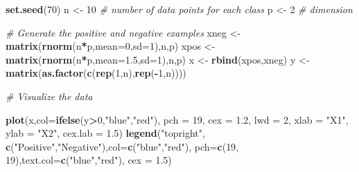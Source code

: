 \documentclass[
]{book}
\newenvironment{Shaded}{\begin{snugshade}}{\end{snugshade}}
\newcommand{\AttributeTok}[1]{\textcolor[rgb]{0.13,0.29,0.53}{#1}}
\newcommand{\CommentTok}[1]{\textcolor[rgb]{0.56,0.35,0.01}{\textit{#1}}}
\newcommand{\DecValTok}[1]{\textcolor[rgb]{0.00,0.00,0.81}{#1}}
\newcommand{\FloatTok}[1]{\textcolor[rgb]{0.00,0.00,0.81}{#1}}
\newcommand{\FunctionTok}[1]{\textcolor[rgb]{0.13,0.29,0.53}{\textbf{#1}}}
\newcommand{\NormalTok}[1]{#1}
\newcommand{\OtherTok}[1]{\textcolor[rgb]{0.56,0.35,0.01}{#1}}
\newcommand{\SpecialCharTok}[1]{\textcolor[rgb]{0.81,0.36,0.00}{\textbf{#1}}}
\newcommand{\StringTok}[1]{\textcolor[rgb]{0.31,0.60,0.02}{#1}}
\theoremstyle{definition}
\theoremstyle{definition}
\theoremstyle{definition}
\theoremstyle{definition}
\theoremstyle{remark}
\begin{document}
\begin{Shaded}
\begin{Highlighting}[]

    \FunctionTok{set.seed}\NormalTok{(}\DecValTok{70}\NormalTok{)}
\NormalTok{    n }\OtherTok{\textless{}{-}} \DecValTok{10} \CommentTok{\# number of data points for each class}
\NormalTok{    p }\OtherTok{\textless{}{-}} \DecValTok{2} \CommentTok{\# dimension}

    \CommentTok{\# Generate the positive and negative examples}
\NormalTok{    xneg }\OtherTok{\textless{}{-}} \FunctionTok{matrix}\NormalTok{(}\FunctionTok{rnorm}\NormalTok{(n}\SpecialCharTok{*}\NormalTok{p,}\AttributeTok{mean=}\DecValTok{0}\NormalTok{,}\AttributeTok{sd=}\DecValTok{1}\NormalTok{),n,p)}
\NormalTok{    xpos }\OtherTok{\textless{}{-}} \FunctionTok{matrix}\NormalTok{(}\FunctionTok{rnorm}\NormalTok{(n}\SpecialCharTok{*}\NormalTok{p,}\AttributeTok{mean=}\FloatTok{1.5}\NormalTok{,}\AttributeTok{sd=}\DecValTok{1}\NormalTok{),n,p)}
\NormalTok{    x }\OtherTok{\textless{}{-}} \FunctionTok{rbind}\NormalTok{(xpos,xneg)}
\NormalTok{    y }\OtherTok{\textless{}{-}} \FunctionTok{matrix}\NormalTok{(}\FunctionTok{as.factor}\NormalTok{(}\FunctionTok{c}\NormalTok{(}\FunctionTok{rep}\NormalTok{(}\DecValTok{1}\NormalTok{,n),}\FunctionTok{rep}\NormalTok{(}\SpecialCharTok{{-}}\DecValTok{1}\NormalTok{,n))))}

    \CommentTok{\# Visualize the data}
    
    \FunctionTok{plot}\NormalTok{(x,}\AttributeTok{col=}\FunctionTok{ifelse}\NormalTok{(y}\SpecialCharTok{\textgreater{}}\DecValTok{0}\NormalTok{,}\StringTok{"blue"}\NormalTok{,}\StringTok{"red"}\NormalTok{), }\AttributeTok{pch =} \DecValTok{19}\NormalTok{, }\AttributeTok{cex =} \FloatTok{1.2}\NormalTok{, }\AttributeTok{lwd =} \DecValTok{2}\NormalTok{, }
         \AttributeTok{xlab =} \StringTok{"X1"}\NormalTok{, }\AttributeTok{ylab =} \StringTok{"X2"}\NormalTok{, }\AttributeTok{cex.lab =} \FloatTok{1.5}\NormalTok{)}
    \FunctionTok{legend}\NormalTok{(}\StringTok{"topright"}\NormalTok{, }\FunctionTok{c}\NormalTok{(}\StringTok{"Positive"}\NormalTok{,}\StringTok{"Negative"}\NormalTok{),}\AttributeTok{col=}\FunctionTok{c}\NormalTok{(}\StringTok{"blue"}\NormalTok{,}\StringTok{"red"}\NormalTok{),}
           \AttributeTok{pch=}\FunctionTok{c}\NormalTok{(}\DecValTok{19}\NormalTok{, }\DecValTok{19}\NormalTok{),}\AttributeTok{text.col=}\FunctionTok{c}\NormalTok{(}\StringTok{"blue"}\NormalTok{,}\StringTok{"red"}\NormalTok{), }\AttributeTok{cex =} \FloatTok{1.5}\NormalTok{)}


\end{Highlighting}
\end{Shaded}
\end{document}
